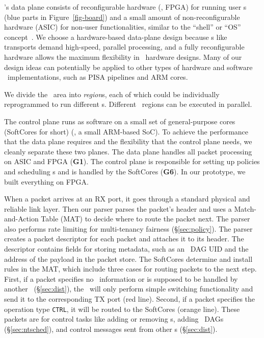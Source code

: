 \snic's data plane consists of reconfigurable hardware (\eg, FPGA) for running user \nt{}s (blue parts in Figure~\ref{fig-board})
and a small amount of non-reconfigurable hardware (ASIC) for non-user functionalities, similar to the ``shell'' or ``OS'' concept~\cite{Catapult-v2,Amazon-F1,amorphos-osdi18,coyote-osdi20}.
We choose a hardware-based data-plane design because \nt{}s like transports demand high-speed, parallel processing, and a fully reconfigurable hardware allows the maximum flexibility in \nt\ hardware designs.
Many of our design ideas can potentially be applied to other types of hardware and software \nt\ implementations, such as PISA pipelines and ARM cores.

We divide the \nt\ area into {\em region}s, each of which could be individually reprogrammed to run different \nt{}s.
Different \nt\ regions can be executed in parallel.

The control plane runs as software on a small set of general-purpose cores (SoftCores for short) (\eg, a small ARM-based SoC). 
To achieve the performance that the data plane requires and the flexibility that the control plane needs, we cleanly separate these two planes.
The data plane handles all packet processing on ASIC and FPGA (\textbf{G1}).
The control plane is responsible for setting up policies and scheduling \nt{}s and is handled by the SoftCores (\textbf{G6}).
In our prototype, we built everything on FPGA. 


When a packet arrives at an RX port, it goes through a standard physical and reliable link layer.
Then our parser parses the packet's header and uses a Match-and-Action Table (MAT) to decide where to route the packet next.
The parser also performs rate limiting for multi-tenancy fairness (\S\ref{sec:policy}).
The parser creates a packet descriptor for each packet and attaches it to its header. The descriptor contains fields for storing metadata, such as an \nt\ DAG UID and the address of the payload in the packet store. 
The SoftCores determine and install rules in the MAT, which include three cases for routing packets to the next step. %
First, if a packet specifies no \nt\ information or is supposed to be handled by another \snic\ (\S\ref{sec:dist}), the \snic\ will only perform simple switching functionality and send it to the corresponding TX port (red line).
Second, if a packet specifies the operation type \texttt{CTRL}, it will be routed to the SoftCores (orange line). These packets are for control tasks like adding or removing \nt{}s, adding \nt\ DAGs (\S\ref{sec:ntsched}), and control messages sent from other \snic{}s (\S\ref{sec:dist}).

